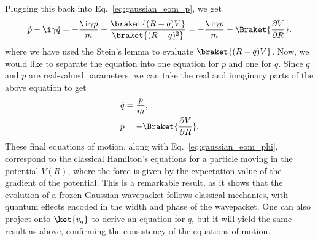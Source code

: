 Plugging this back into Eq.~\eqref{eq:gaussian_eom_p}, we get
\begin{equation}
\dot p-\i\gamma\dot q=-\frac{\i\gamma p}{m}-\frac{\braket{(R-q)V}}{\braket{(R-q)^2}}=-\frac{\i\gamma p}{m}-\Braket{\frac{\partial V}{\partial R}}.
\end{equation}
where we have used the Stein's lemma to evaluate $\braket{(R-q)V}$. Now, we would like to separate the equation into one equation for $\dot p$ and one for $\dot q$. Since $q$ and $p$ are real-valued parameters, we can take the real and imaginary parts of the above equation to get
\begin{align}
\dot q&=\frac{p}{m},\\
\dot p&=-\Braket{\frac{\partial V}{\partial R}}.
\end{align}
These final equations of motion, along with Eq.~\eqref{eq:gaussian_eom_phi}, correspond to the classical Hamilton's equations for a particle moving in the potential $V(R)$, where the force is given by the expectation value of the gradient of the potential. This is a remarkable result, as it shows that the evolution of a frozen Gaussian wavepacket follows classical mechanics, with quantum effects encoded in the width and phase of the wavepacket. One can also project onto $\ket{v_q}$ to derive an equation for $\dot q$, but it will yield the same result as above, confirming the consistency of the equations of motion.
